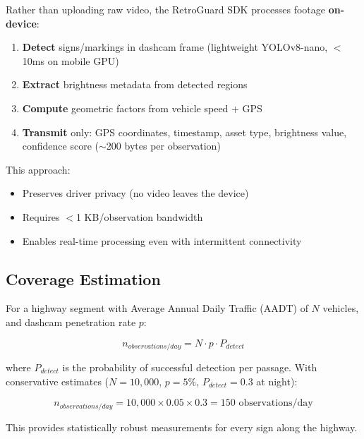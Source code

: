 \documentclass[11pt,a4paper]{article}
\begin{document}
Rather than uploading raw video, the RetroGuard SDK processes footage \textbf{on-device}:

\begin{enumerate}[noitemsep]
    \item \textbf{Detect} signs/markings in dashcam frame (lightweight YOLOv8-nano, $<$10ms on mobile GPU)
    \item \textbf{Extract} brightness metadata from detected regions
    \item \textbf{Compute} geometric factors from vehicle speed + GPS
    \item \textbf{Transmit} only: GPS coordinates, timestamp, asset type, brightness value, confidence score ($\sim$200 bytes per observation)
\end{enumerate}

This approach:
\begin{itemize}[noitemsep]
    \item Preserves driver privacy (no video leaves the device)
    \item Requires $<$1 KB/observation bandwidth
    \item Enables real-time processing even with intermittent connectivity
\end{itemize}

\subsection{Coverage Estimation}

For a highway segment with Average Annual Daily Traffic (AADT) of $N$ vehicles, and dashcam penetration rate $p$:

\begin{equation}
n_{observations/day} = N \cdot p \cdot P_{detect}
\label{eq:coverage}
\end{equation}

where $P_{detect}$ is the probability of successful detection per passage. With conservative estimates ($N = 10,000$, $p = 5\%$, $P_{detect} = 0.3$ at night):

\begin{equation}
n_{observations/day} = 10{,}000 \times 0.05 \times 0.3 = 150 \text{ observations/day}
\label{eq:coverage_est}
\end{equation}

This provides statistically robust measurements for every sign along the highway.


\end{document}
